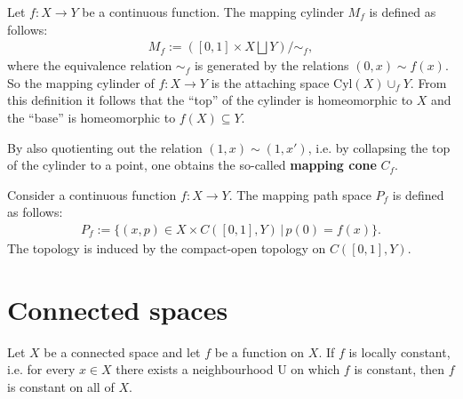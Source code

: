     \begin{construct}\label{topology:mapping_cylinder}
        Let $f:X\rightarrow Y$ be a continuous function. The mapping cylinder $M_f$ is defined as follows:
        \begin{gather}
            M_f := \left([0,1]\times X\bigsqcup Y\right)/\sim_f,
        \end{gather}
        where the equivalence relation $\sim_f$ is generated by the relations $(0,x)\sim f(x)$. So the mapping cylinder of $f:X\rightarrow Y$ is the attaching space $\text{Cyl}(X)\cup_f Y$. From this definition it follows that the ``top'' of the cylinder is homeomorphic to $X$ and the ``base'' is homeomorphic to $f(X)\subseteq Y$.

        By also quotienting out the relation $(1,x)\sim(1,x')$, i.e. by collapsing the top of the cylinder to a point, one obtains the so-called \textbf{mapping cone} $C_f$.
    \end{construct}

    \begin{construct}\label{topology:mapping_path_space}
        Consider a continuous function $f:X\rightarrow Y$. The mapping path space $P_f$ is defined as follows:
        \begin{gather}
            P_f := \big\{(x,p)\in X\times C([0,1], Y)\,\big\vert\,p(0)=f(x)\big\}.
        \end{gather}
        The topology is induced by the compact-open topology on $C([0,1], Y)$.
    \end{construct}

\section{Connected spaces}


    \begin{property}
        Let $X$ be a connected space and let $f$ be a function on $X$. If $f$ is locally constant, i.e. for every $x\in X$ there exists a neighbourhood U on which $f$ is constant, then $f$ is constant on all of $X$.
    \end{property}

